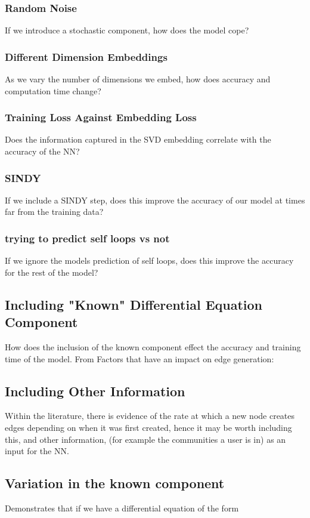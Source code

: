 \documentclass{article}
\begin{document}
            \subsubsection{Random Noise}
                If we introduce a stochastic component, how does the model cope?
            \subsubsection{Different Dimension Embeddings}
                As we vary the number of dimensions we embed, how does accuracy and computation time change?
            \subsubsection{Training Loss Against Embedding Loss}
                Does the information captured in the SVD embedding correlate with the accuracy of the NN?
            \subsubsection{SINDY}
                If we include a SINDY step, does this improve the accuracy of our model at times far from the training data?
            \subsubsection{trying to predict self loops vs not}
                If we ignore the models prediction of self loops, does this improve the accuracy for the rest of the model?
            \subsection{Including "Known" Differential Equation Component}
                How does the inclusion of the known component effect the accuracy and training time of the model.
                From \cite{garg2009evolution}
                Factors that have an impact on edge generation:
                    
    \subsection{Including Other Information}
        Within the literature, there is evidence of the rate at which a new node creates edges depending on when it was first created, hence it may be worth including this, and other information, (for example the communities a user is in) as an input for the NN.
    \subsection{Variation in the known component}
        \cite{SciML_C_Rak} Demonstrates that if we have a differential equation of the form
        
\end{document}
